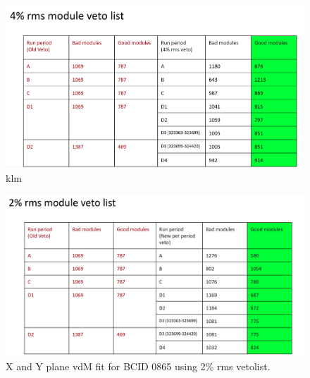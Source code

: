 \begin{figure}[!htp]
\centering
\includegraphics[width=1\textwidth]{ashish_thesis/4per_rms_veto.png}
\caption{%
   klm
}
\label{fig:4per_veto}
\end{figure}


\begin{figure}[!htp]
\centering
\includegraphics[width=1\textwidth]{ashish_thesis/2per_rms_veto.png}
\caption{%
   X and Y plane vdM fit for BCID 0865 using 2\% rms  vetolist.
}
\label{fig:2per_veto}
\end{figure}



